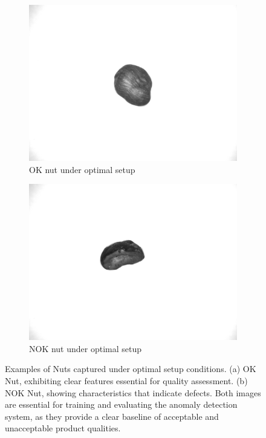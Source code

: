 \documentclass[12pt,DIV14,BCOR12mm,a4paper,footinclude=false,headinclude,parskip=half-,twoside,openright,cleardoublepage=empty,toc=index,bibliography=totoc,listof=totoc]{scrreprt}
\numberwithin{equation}{chapter}
\begin{document}
\begin{figure}
    \centering
    \begin{subfigure}[b]{0.45\textwidth}
        \centering
        \includegraphics[scale=0.15]{../media/Nuts-Optimal-OK.png}
        \caption{OK nut under optimal setup}
        \label{fig:nut_ok}
    \end{subfigure}
    \hfill
    \begin{subfigure}[b]{0.45\textwidth}
        \centering
        \includegraphics[scale=0.15]{../media/Nuts-optimal-NOK.png}
        \caption{NOK nut under optimal setup}
        \label{fig:nut_nok}
    \end{subfigure}
    \caption{Examples of Nuts captured under optimal setup conditions. (a) OK Nut, exhibiting clear features essential for quality assessment. (b) NOK Nut, showing characteristics that indicate defects. Both images are essential for training and evaluating the anomaly detection system, as they provide a clear baseline of acceptable and unacceptable product qualities.}
    \label{fig:optimal_setup}
\end{figure}
\end{document}
